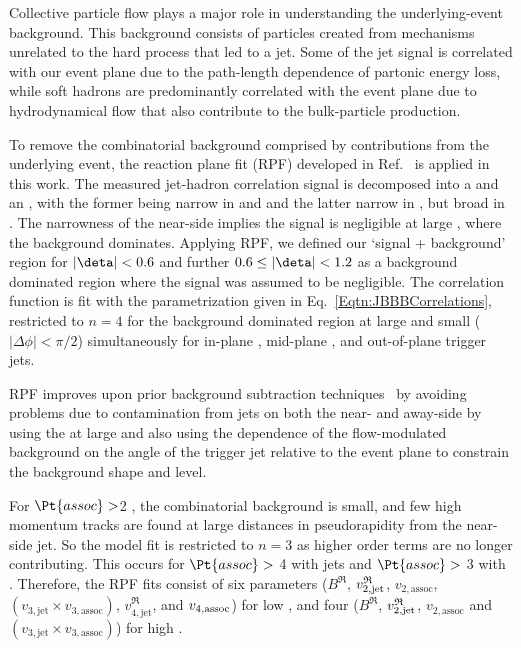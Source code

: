 Collective particle flow plays a major role in understanding the underlying-event background.  This background consists of particles created from mechanisms unrelated to the hard process that led to a jet.  Some of the jet signal is correlated with our event plane due to the path-length dependence of partonic energy loss, while soft hadrons are predominantly correlated with the event plane due to hydrodynamical flow that also contribute to the bulk-particle production. 

\label{sect:RPF}
To remove the combinatorial background comprised by contributions from the underlying event, the reaction plane fit (RPF) developed in Ref.~\cite{Sharma:2015qra} is applied in this work. The measured jet-hadron correlation signal is decomposed into a \ns and an \as, with the former being narrow in \dphi and \deta and the latter narrow in \dphi, but broad in \deta.  The narrowness of the near-side implies the signal is negligible at large \deta, where the background dominates.  Applying RPF, we defined our `signal + background' region for $|\deta| < 0.6$ and further $0.6 \leq |\deta| < 1.2$ as a background dominated region where the signal was assumed to be negligible.  The correlation function is fit with the parametrization given in Eq.~\ref{Eqtn:JBBBCorrelations}, restricted to $n=4$ for the background dominated region at large \deta and small \dphi ($|\Delta\phi|<\pi/2$) simultaneously for in-plane , mid-plane , and out-of-plane trigger jets. 

RPF improves upon prior background subtraction techniques~\cite{PhysRevC.101.064901,Nattrass:2016cln} by avoiding problems due to contamination from jets on both the near- and away-side by using the \ns at large \deta and also using the dependence of the flow-modulated background on the angle of the trigger jet relative to the event plane to constrain the background shape and level. %


For $\Pt{assoc} >$2 \GeVc, the combinatorial background is small, and few high momentum tracks are found at large distances in pseudorapidity from the near-side jet. So the model fit is restricted to $n = 3$ as higher order terms are no longer contributing.  This occurs for $\Pt{assoc} >$ 4 \GeVc with  jets and $\Pt{assoc} >$ 3 \GeVc with .  Therefore, the RPF fits consist of six parameters ($B^\mathfrak{R}$, $v^\mathfrak{R}_{2, \rm jet}$, $v_{2, \mathrm {assoc}}$, $(v_{3, \mathrm {jet}}\times v_{3, \mathrm {assoc}})$, $v^\mathfrak{R}_{4, \mathrm {jet}}$, and $v_{4, \rm assoc}$) for low , and four ($B^\mathfrak{R}$, $v^\mathfrak{R}_{2, \rm jet}$, $v_{2, \mathrm {assoc}}$ and $(v_{3, \mathrm {jet}}\times v_{3, \mathrm {assoc}})$) for high .

